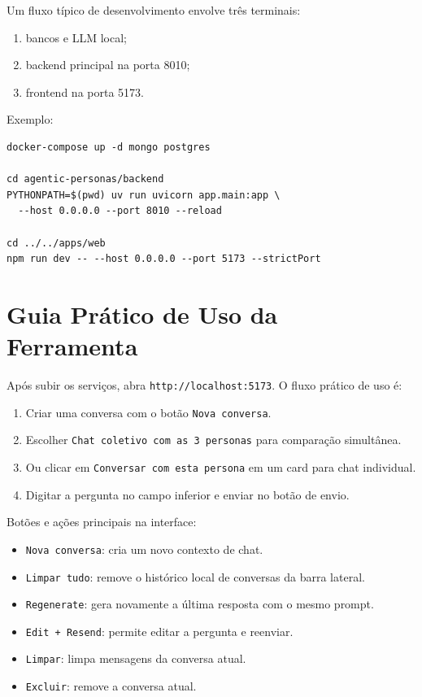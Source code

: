 \documentclass[12pt,a4paper]{article}
\begin{document}
Um fluxo típico de desenvolvimento envolve três terminais:

\begin{enumerate}
  \item bancos e LLM local;
  \item backend principal na porta 8010;
  \item frontend na porta 5173.
\end{enumerate}

Exemplo:

\begin{verbatim}
docker-compose up -d mongo postgres

cd agentic-personas/backend
PYTHONPATH=$(pwd) uv run uvicorn app.main:app \
  --host 0.0.0.0 --port 8010 --reload

cd ../../apps/web
npm run dev -- --host 0.0.0.0 --port 5173 --strictPort
\end{verbatim}

\section{Guia Prático de Uso da Ferramenta}

Após subir os serviços, abra \texttt{http://localhost:5173}. O fluxo prático de uso é:

\begin{enumerate}
  \item Criar uma conversa com o botão \texttt{Nova conversa}.
  \item Escolher \texttt{Chat coletivo com as 3 personas} para comparação simultânea.
  \item Ou clicar em \texttt{Conversar com esta persona} em um card para chat individual.
  \item Digitar a pergunta no campo inferior e enviar no botão de envio.
\end{enumerate}

Botões e ações principais na interface:

\begin{itemize}
  \item \texttt{Nova conversa}: cria um novo contexto de chat.
  \item \texttt{Limpar tudo}: remove o histórico local de conversas da barra lateral.
  \item \texttt{Regenerate}: gera novamente a última resposta com o mesmo prompt.
  \item \texttt{Edit + Resend}: permite editar a pergunta e reenviar.
  \item \texttt{Limpar}: limpa mensagens da conversa atual.
  \item \texttt{Excluir}: remove a conversa atual.
\end{itemize}
\end{document}
